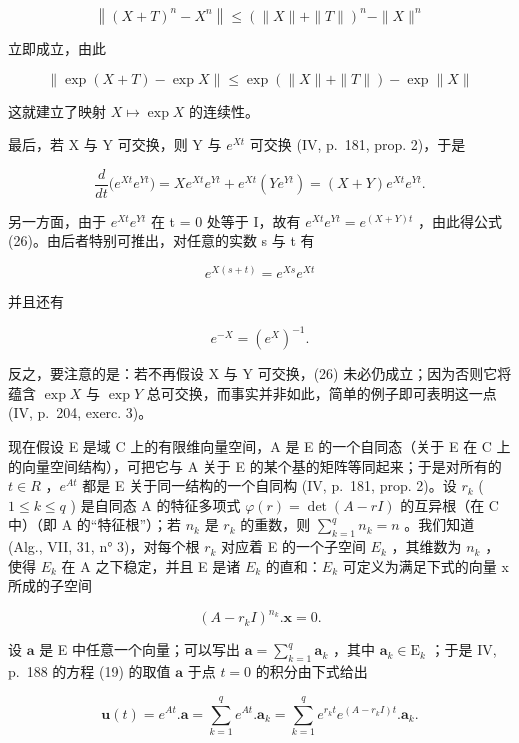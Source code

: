 \[
\left\| (X + T) ^ {n} - X ^ {n} \right\| \leqslant \left(\| X \| + \| T \|\right) ^ {n} - \| X \| ^ {n}
\]

立即成立，由此

\[
\| \exp (X + T) - \exp X \| \leqslant \exp \left(\| X \| + \| T \|\right) - \exp \| X \|\tag{28}
\]

这就建立了映射 \(X \mapsto \exp X\) 的连续性。

最后，若 X 与 Y 可交换，则 Y 与 \(e^{Xt}\) 可交换 (IV, p.~181, prop. 2)，于是

\[
\frac {d}{d t} \big (e ^ {X t} e ^ {Y t} \big) = X e ^ {X t} e ^ {Y t} + e ^ {X t} (Y e ^ {Y t}) = (X + Y) e ^ {X t} e ^ {Y t}.
\]

另一方面，由于 \(e^{Xt}e^{Yt}\) 在 t = 0 处等于 I，故有 \(e^{Xt}e^{Yt} = e^{(X+Y)t}\) ，由此得公式 (26)。由后者特别可推出，对任意的实数 s 与 t 有

\[
e ^ {X (s + t)} = e ^ {X s} e ^ {X t}\tag{29}
\]

并且还有

\[
e ^ {- X} = \left(e ^ {X}\right) ^ {- 1}.\tag{30}
\]

反之，要注意的是：若不再假设 X 与 Y 可交换，(26) 未必仍成立；因为否则它将蕴含 \(\exp X\) 与 \(\exp Y\) 总可交换，而事实并非如此，简单的例子即可表明这一点 (IV, p.~204, exerc. 3)。

现在假设 E 是域 C 上的有限维向量空间，A 是 E 的一个自同态（关于 E 在 C 上的向量空间结构），可把它与 A 关于 E 的某个基的矩阵等同起来；于是对所有的 \(t \in R\) ，\(e^{At}\) 都是 E 关于同一结构的一个自同构 (IV, p.~181, prop. 2)。设 \(r_k\) ( \(1 \leqslant k \leqslant q\) ) 是自同态 A 的特征多项式 \(\varphi(r) = \det(A - rI)\) 的互异根（在 C 中）（即 A 的“特征根”）；若 \(n_k\) 是 \(r_k\) 的重数，则 \(\sum_{k=1}^{q} n_k = n\) 。我们知道 (Alg., VII, 31, n° 3)，对每个根 \(r_k\) 对应着 E 的一个子空间 \(E_k\) ，其维数为 \(n_k\) ，使得 \(E_k\) 在 A 之下稳定，并且 E 是诸 \(E_k\) 的直和：\(E_k\) 可定义为满足下式的向量 x 所成的子空间

\[
(A - r _ {k} I) ^ {n _ {k}}. \mathbf {x} = 0.
\]

设 \(\mathbf{a}\) 是 E 中任意一个向量；可以写出 \(\mathbf{a} = \sum_{k=1}^{q} \mathbf{a}_k\) ，其中 \(\mathbf{a}_k \in \mathrm{E}_k\) ；于是 IV, p.~188 的方程 (19) 的取值 \(\mathbf{a}\) 于点 \(t = 0\) 的积分由下式给出

\[
\mathbf {u} (t) = e ^ {A t}. \mathbf {a} = \sum_ {k = 1} ^ {q} e ^ {A t}. \mathbf {a} _ {k} = \sum_ {k = 1} ^ {q} e ^ {r _ {k} t} e ^ {(A - r _ {k} I) t}. \mathbf {a} _ {k}.
\]

